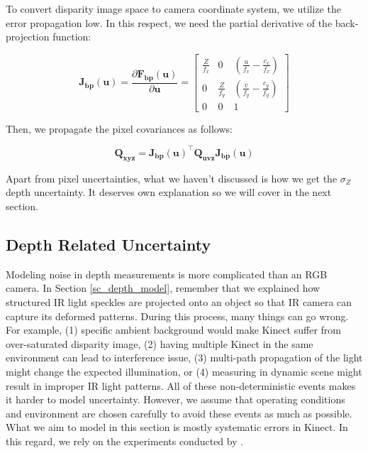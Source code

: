 \documentclass[a4paper]{report}
\numberwithin{figure}{section}
\begin{document}
To convert disparity image space to camera coordinate system, we utilize the
error propagation low. In this respect, we need the partial derivative of the
back-projection function:

\begin{equation} \label{eq:jacob_back_proj}
  \mathbf{J_{bp}}(\mathbf{u}) = \frac{\partial
\mathbf{F_{bp}}(\mathbf{u})}{\partial \mathbf{u}}  = \begin{bmatrix}
\frac{Z}{f_x} & 0 & (\frac{u}{f_x} - \frac{c_x}{f_x}) \\ 0 & \frac{Z}{f_y} &
(\frac{v}{f_y} - \frac{c_y}{f_y}) \\ 0 & 0 & 1 \end{bmatrix} \end{equation}

Then, we propagate the pixel covariances as follows:

\begin{equation} \mathbf{Q_{xyz}} = \mathbf{J_{bp}}(\mathbf{u})^\top
\mathbf{Q_{uvz}} \mathbf{J_{bp}}(\mathbf{u}) \end{equation}


Apart from pixel uncertainties, what we haven't discussed is how we get the
$\sigma_Z$ depth uncertainty.  It deserves own explanation so we will cover in
the next section.

\subsection{Depth Related Uncertainty} \label{sb_sc_depth_uncertainty}

Modeling noise in depth measurements is more complicated than an RGB camera.
In Section \ref{sc_depth_model}, remember that we explained how structured IR
light speckles are projected onto an object so that IR camera can capture its
deformed patterns.  During this process, many things can go wrong. For example,
(1) specific ambient background would make Kinect suffer from over-saturated
disparity image, (2) having multiple Kinect in the same environment can lead to
interference issue, (3) multi-path propagation of the light might change the
expected illumination, or (4) measuring in dynamic scene might result in
improper IR light patterns. All of these non-deterministic events makes it
harder to model uncertainty. However, we assume that operating conditions
and environment are chosen carefully to avoid these events as much as possible.
What we aim to model in this section is mostly systematic errors in Kinect. In
this regard, we rely on the experiments conducted by \parencite{Nguyen2012a}. 
\end{document}

